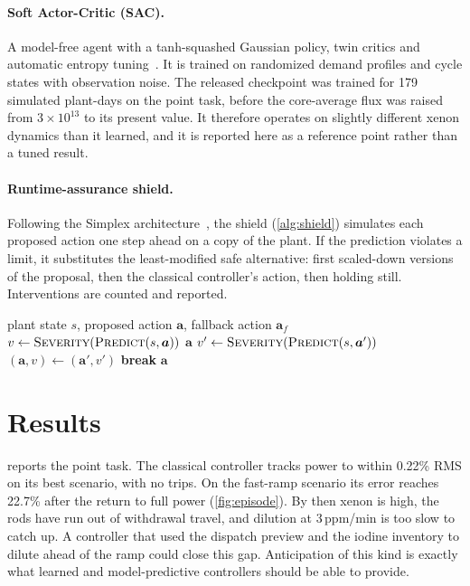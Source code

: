 \documentclass[11pt,a4paper]{article}
\begin{document}
\paragraph{Soft Actor-Critic (SAC).} A model-free agent with a tanh-squashed Gaussian
policy, twin critics and automatic entropy tuning~\cite{haarnoja2018}. It is trained
on randomized demand profiles and cycle states with observation noise. The released
checkpoint was trained for 179 simulated plant-days on the point task, before the
core-average flux was raised from $3\times10^{13}$ to its present value. It therefore
operates on slightly different xenon dynamics than it learned, and it is reported
here as a reference point rather than a tuned result.

\paragraph{Runtime-assurance shield.} Following the Simplex
architecture~\cite{sha2001}, the shield (\cref{alg:shield}) simulates each proposed
action one step ahead on a copy of the plant. If the prediction violates a limit, it
substitutes the least-modified safe alternative: first scaled-down versions of the
proposal, then the classical controller's action, then holding still. Interventions
are counted and reported.

\begin{algorithm}[!htbp]
  \caption{One-step runtime-assurance shield}
  \label{alg:shield}
  \begin{algorithmic}[1]
    \Require plant state $s$, proposed action $\bm a$, fallback action $\bm a_f$
    \State $v \gets \textsc{Severity}(\textsc{Predict}(s, \bm a))$
     \Return $\bm a$ \EndIf
      \State $v' \gets \textsc{Severity}(\textsc{Predict}(s, \bm a'))$
       $(\bm a, v) \gets (\bm a', v')$ \EndIf
       \textbf{break} \EndIf
    \EndFor
    \State \Return $\bm a$ 
  \end{algorithmic}
\end{algorithm}

\section{Results}\label{sec:results}

 reports the point task. The classical controller tracks power
to within 0.22\% RMS on its best scenario, with no trips. On the fast-ramp
scenario its error reaches 22.7\% after the return to full power
(\cref{fig:episode}). By then xenon is high, the rods have run out of withdrawal travel,
and dilution at 3\,ppm/min is too slow to catch up. A controller that used the dispatch
preview and the iodine inventory to dilute ahead of the ramp could close this gap.
Anticipation of this kind is exactly what learned and model-predictive controllers
should be able to provide.
\end{document}
